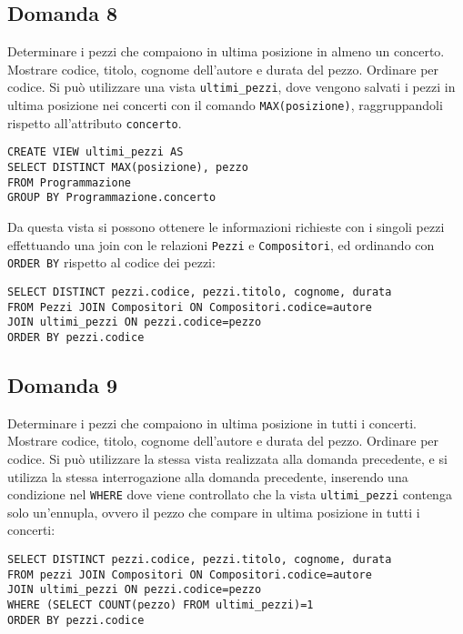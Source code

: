 \documentclass{article}
\numberwithin{equation}{subsection}
\begin{document}
\subsection*{Domanda 8}
Determinare i pezzi che compaiono in ultima posizione in almeno un concerto. Mostrare codice, titolo, cognome dell'autore e durata del pezzo. Ordinare per codice. Si può utilizzare una vista \verb|ultimi_pezzi|, 
dove vengono salvati i pezzi in ultima posizione nei concerti con il comando \verb|MAX(posizione)|, raggruppandoli rispetto all'attributo \verb|concerto|. 
\begin{verbatim}
CREATE VIEW ultimi_pezzi AS
SELECT DISTINCT MAX(posizione), pezzo
FROM Programmazione 
GROUP BY Programmazione.concerto
\end{verbatim}
Da questa vista si possono ottenere le informazioni richieste con i singoli pezzi effettuando una join con le relazioni \verb|Pezzi| e \verb|Compositori|, ed ordinando con \verb|ORDER BY| rispetto al codice dei 
pezzi:
\begin{verbatim}
SELECT DISTINCT pezzi.codice, pezzi.titolo, cognome, durata
FROM Pezzi JOIN Compositori ON Compositori.codice=autore
JOIN ultimi_pezzi ON pezzi.codice=pezzo
ORDER BY pezzi.codice
\end{verbatim}

\subsection*{Domanda 9}
Determinare i pezzi che compaiono in ultima posizione in tutti i concerti. Mostrare codice, titolo, cognome dell'autore e durata del pezzo. Ordinare per codice. Si può utilizzare la stessa vista realizzata 
alla domanda precedente, e si utilizza la stessa interrogazione alla domanda precedente, inserendo una condizione nel \verb|WHERE| dove viene controllato che la vista \verb|ultimi_pezzi| contenga solo un'ennupla, 
ovvero il pezzo che compare in ultima posizione in tutti i concerti:
\begin{verbatim}
SELECT DISTINCT pezzi.codice, pezzi.titolo, cognome, durata
FROM pezzi JOIN Compositori ON Compositori.codice=autore
JOIN ultimi_pezzi ON pezzi.codice=pezzo
WHERE (SELECT COUNT(pezzo) FROM ultimi_pezzi)=1
ORDER BY pezzi.codice
\end{verbatim}
\end{document}
